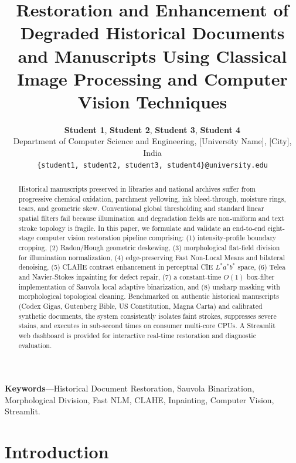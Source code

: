 \documentclass[11pt, a4paper]{article}
\title{\Large\textbf{Restoration and Enhancement of Degraded Historical Documents and Manuscripts Using Classical Image Processing and Computer Vision Techniques}}
\author{
\textbf{Student 1}, \quad \textbf{Student 2}, \quad \textbf{Student 3}, \quad \textbf{Student 4} \\[0.3em]
\normalsize Department of Computer Science and Engineering, [University Name], [City], India \\
\normalsize \texttt{\{student1, student2, student3, student4\}@university.edu}
}
\date{}
\begin{document}
\maketitle
\thispagestyle{empty}

\begin{abstract}
\noindent Historical manuscripts preserved in libraries and national archives suffer from progressive chemical oxidation, parchment yellowing, ink bleed-through, moisture rings, tears, and geometric skew. Conventional global thresholding and standard linear spatial filters fail because illumination and degradation fields are non-uniform and text stroke topology is fragile. In this paper, we formulate and validate an end-to-end eight-stage computer vision restoration pipeline comprising: (1) intensity-profile boundary cropping, (2) Radon/Hough geometric deskewing, (3) morphological flat-field division for illumination normalization, (4) edge-preserving Fast Non-Local Means and bilateral denoising, (5) CLAHE contrast enhancement in perceptual CIE $L^*a^*b^*$ space, (6) Telea and Navier-Stokes inpainting for defect repair, (7) a constant-time $O(1)$ box-filter implementation of Sauvola local adaptive binarization, and (8) unsharp masking with morphological topological cleaning. Benchmarked on authentic historical manuscripts (Codex Gigas, Gutenberg Bible, US Constitution, Magna Carta) and calibrated synthetic documents, the system consistently isolates faint strokes, suppresses severe stains, and executes in sub-second times on consumer multi-core CPUs. A Streamlit web dashboard is provided for interactive real-time restoration and diagnostic evaluation.
\end{abstract}

\vspace{0.4em}
\noindent\textbf{Keywords}---Historical Document Restoration, Sauvola Binarization, Morphological Division, Fast NLM, CLAHE, Inpainting, Computer Vision, Streamlit.
\vspace{0.8em}

\section{Introduction}
\end{document}
